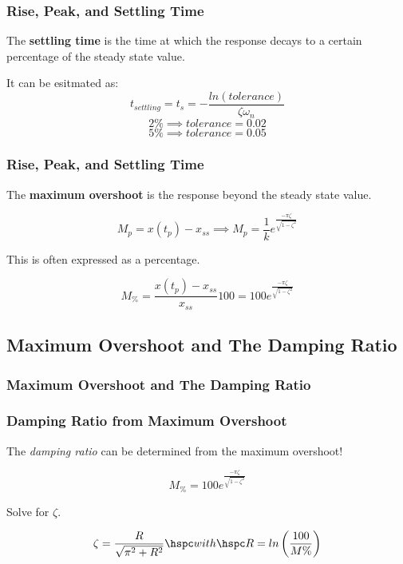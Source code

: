 \documentclass[fleqn]{beamer} %
\newcommand{\sectionIVsubsectionIItitle}{Rise, Peak, and Settling Time}
\newcommand{\sectionIVsubsectionIIItitle}{Maximum Overshoot and The Damping Ratio}
\begin{document}
			\begin{frame}
				\frametitle{\sectionIVsubsectionIItitle}
				\bigskip


				The {\bf settling time} is the time at which the response decays to a certain percentage of the steady state value.\vspc

				It can be esitmated as:\vspc
				\[ t_{settling}=t_s=-\frac{ln(tolerance)}{\zeta\omega_n} \] 
				\[ 2\%\implies tolerance=0.02 \]
				\[ 5\%\implies tolerance=0.05 \]


				\btVFill
			\end{frame}

			\begin{frame}
				\frametitle{\sectionIVsubsectionIItitle}
				\bigskip


				The {\bf maximum overshoot} is the response beyond the steady state value. \vspc

				\[ M_p=x(t_p)-x_{ss}\implies M_p=\frac{1}{k}e^{\frac{-\pi\zeta}{\sqrt{1-\zeta^2}}} \]

				This is often expressed as a percentage. \vspc

				\[ M_\%=\frac{x(t_p)-x_{ss}}{x_{ss}}100=100e^{\frac{-\pi\zeta}{\sqrt{1-\zeta^2}} } \]



				\btVFill
			\end{frame}


		\subsection{\sectionIVsubsectionIIItitle}\label{sectionIVsubsectionIV}

			\begin{frame}
				\frametitle{\sectionIVsubsectionIIItitle}
				\bigskip

				\frametitle{Damping Ratio from Maximum Overshoot}

				The {\it damping ratio} can be determined from the maximum overshoot! \vspc

				\[ M_\%=100e^{\frac{-\pi\zeta}{\sqrt{1-\zeta^2}}} \]\vspc

				Solve for $\zeta$.\vspc

				\[ \zeta=\frac{R}{\sqrt{\pi^2+R^2}} \hspc with \hspc R=ln\left(\frac{100}{M\%}\right) \]


				\btVFill
			\end{frame}
\end{document}
